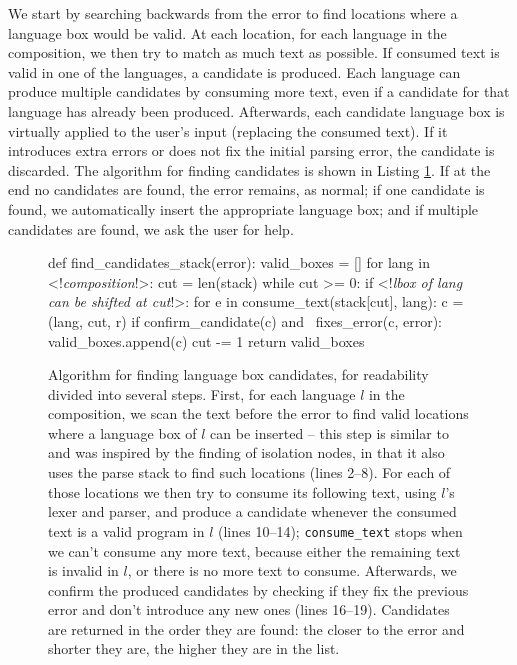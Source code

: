 \documentclass[sigplan,screen]{acmart}\settopmatter{printfolios=true,printccs=false,printacmref=false}
\begin{document}
We start by searching backwards from the error to find locations where a
language box would be valid. At each location, for each language in the composition,
we then try to match as much text as possible. If consumed text is valid in one
of the languages, a candidate is produced. Each language can produce multiple
candidates by consuming more text, even if a candidate for that language has
already been produced. Afterwards, each candidate language box is virtually
applied to the user's input (replacing the consumed text). If it introduces
extra errors or does not fix the initial parsing error, the candidate is
discarded. The algorithm for finding candidates is shown in Listing
\ref{lst_find_candidates}.  If at the end no candidates are found, the error
remains, as normal; if one candidate is found, we automatically insert the
appropriate language box; and if multiple candidates are found, we ask the user
for help.

\begin{figure}[t]
\begin{lstdefault}
def find_candidates_stack(error):
  valid_boxes = []
  for lang in <!\textit{composition}!>:
    cut = len(stack)
    while cut >= 0:
      if <!\textit{lbox of lang can be shifted at cut}!>:
        for e in consume_text(stack[cut], lang):
          c = (lang, cut, r)
          if confirm_candidate(c) and \
              fixes_error(c, error):
            valid_boxes.append(c)
      cut -= 1
  return valid_boxes
\end{lstdefault}
\caption{Algorithm for finding language box candidates, for readability divided into
several steps. First, for each language $l$ in the composition, we scan the text
before the error to find valid locations where a language box of $l$ can be
inserted -- this step is similar to and was inspired by the finding of isolation
nodes, in that it also uses the parse stack to find such locations (lines 2--8). For each of
those locations we then try to consume its following text, using $l$'s lexer and
parser, and produce a candidate whenever the consumed text is a valid program in
$l$ (lines 10--14); \texttt{consume\_text} stops when we can't consume any more text, because either the remaining
text is invalid in $l$, or there is no more text to consume. Afterwards, we
confirm the produced candidates by checking if they fix the previous error and
don't introduce any new ones (lines 16--19).
Candidates are returned in the order they are found: the closer to the error and
shorter they are, the higher they are in the list.}
\label{lst_find_candidates}
\end{figure}
\end{document}
